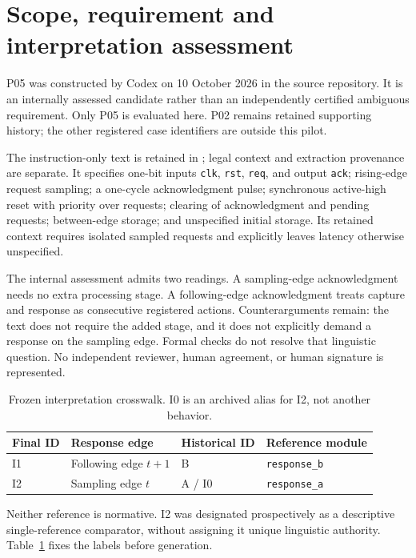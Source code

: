 \documentclass[11pt,a4paper]{article}
\begin{document}
\section{Scope, requirement and interpretation assessment}
P05 was constructed by Codex on 10 October 2026 in the source repository. It is an internally assessed candidate rather than an independently certified ambiguous requirement. Only P05 is evaluated here. P02 remains retained supporting history; the other registered case identifiers are outside this pilot.

The instruction-only text is retained in ; legal context and extraction provenance are separate. It specifies one-bit inputs \texttt{clk}, \texttt{rst}, \texttt{req}, and output \texttt{ack}; rising-edge request sampling; a one-cycle acknowledgment pulse; synchronous active-high reset with priority over requests; clearing of acknowledgment and pending requests; between-edge storage; and unspecified initial storage. Its retained context requires isolated sampled requests and explicitly leaves latency otherwise unspecified.

The internal assessment admits two readings. A sampling-edge acknowledgment needs no extra processing stage. A following-edge acknowledgment treats capture and response as consecutive registered actions. Counterarguments remain: the text does not require the added stage, and it does not explicitly demand a response on the sampling edge. Formal checks do not resolve that linguistic question. No independent reviewer, human agreement, or human signature is represented.

\begin{table}[ht]
\centering
\begin{tabular}{llll}
\toprule
Final ID & Response edge & Historical ID & Reference module\\
\midrule
I1 & Following edge $t+1$ & B & \texttt{response\_b}\\
I2 & Sampling edge $t$ & A / I0 & \texttt{response\_a}\\
\bottomrule
\end{tabular}
\caption{Frozen interpretation crosswalk. I0 is an archived alias for I2, not another behavior.}
\label{tab:interpretations}
\end{table}

Neither reference is normative. I2 was designated prospectively as a descriptive single-reference comparator, without assigning it unique linguistic authority. Table~\ref{tab:interpretations} fixes the labels before generation.
\end{document}
